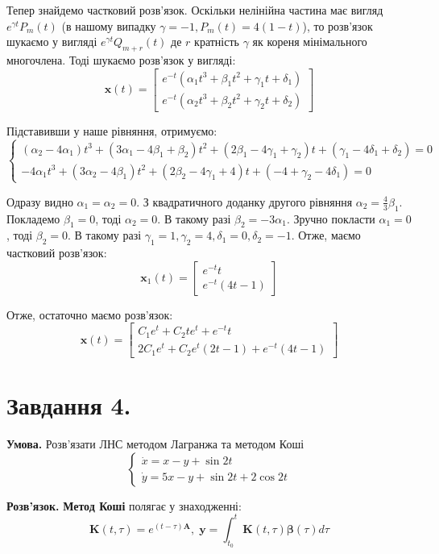 \documentclass[14pt]{extarticle}
\begin{document}
Тепер знайдемо частковий розв'язок. Оскільки нелінійна частина має вигляд $e^{\gamma t}P_m(t)$ (в нашому випадку $\gamma=-1,P_m(t)=4(1-t)$), то розв'язок шукаємо у вигляді $e^{\gamma t}Q_{m+r}(t)$ де $r$ кратність $\gamma$ як кореня мінімального многочлена. Тоді шукаємо розв'язок у вигляді:
\[
\textbf{x}(t) = \begin{bmatrix}
    e^{-t}(\alpha_1 t^3+\beta_1 t^2 + \gamma_1 t + \delta_1) \\ e^{-t}(\alpha_2 t^3 + \beta_2 t^2 + \gamma_2 t + \delta_2)
\end{bmatrix}
\]

Підставивши у наше рівняння, отримуємо:
\[
\begin{cases}
    (\alpha_2-4\alpha_1)t^3 + (3\alpha_1-4\beta_1+\beta_2)t^2 + (2\beta_1-4\gamma_1+\gamma_2)t + (\gamma_1-4\delta_1+\delta_2) = 0 \\
    -4\alpha_1t^3 + (3\alpha_2-4\beta_1)t^2 + (2\beta_2-4\gamma_1+4)t + (-4+\gamma_2-4\delta_1) = 0
\end{cases}
\]

Одразу видно $\alpha_1=\alpha_2=0$. З квадратичного доданку другого рівняння $\alpha_2 = \frac{4}{3}\beta_1$. Покладемо $\beta_1=0$, тоді $\alpha_2=0$. В такому разі $\beta_2=-3\alpha_1$. Зручно покласти $\alpha_1=0$, тоді $\beta_2=0$. В такому разі $\gamma_1=1,\gamma_2=4,\delta_1=0,\delta_2=-1$. Отже, маємо частковий розв'язок:
\[
\textbf{x}_1(t) = \begin{bmatrix}
    e^{-t}t \\ e^{-t}(4t-1)
\end{bmatrix}
\]

Отже, остаточно маємо розв'язок:
\[
\textbf{x}(t) = \begin{bmatrix}
    C_1e^t + C_2te^t + e^{-t}t \\
    2C_1e^t + C_2e^t(2t-1) + e^{-t}(4t-1)
\end{bmatrix}
\]

\section*{Завдання 4.} 

\textbf{Умова.} Розв’язати ЛНС методом Лагранжа та методом Коші
\[
\begin{cases}
    \dot{x} = x - y + \sin 2t \\
    \dot{y} = 5x-y + \sin 2t + 2 \cos 2t
\end{cases}
\]

\textbf{Розв'язок.} \textbf{Метод Коші} полягає у знаходженні:
\[
\boldsymbol{K}(t,\tau) = e^{(t-\tau)\boldsymbol{A}}, \; \textbf{y} = \int_{t_0}^t \boldsymbol{K}(t,\tau)\boldsymbol{\beta}(\tau)d\tau
\]
\end{document}
